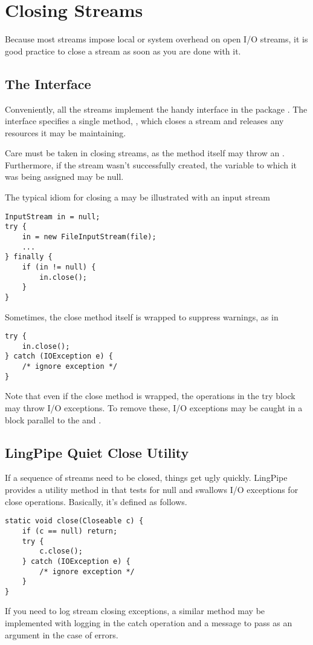 \section{Closing Streams}\label{section:io-closeable}

Because most streams impose local or system overhead on open I/O
streams, it is good practice to close a stream as soon as you are done
with it.  

\subsection{The  Interface}

Conveniently, all the streams implement the handy 
interface in the package .  The 
interface specifies a single method, , which closes a
stream and releases any resources it may be maintaining.

Care must be taken in closing streams, as the  method
itself may throw an .  Furthermore, if the stream
wasn't successfully created, the variable to which it was being
assigned may be null.

The typical idiom for closing a  may be illustrated
with an input stream
%
\begin{verbatim}
InputStream in = null;
try {
    in = new FileInputStream(file);
    ...
} finally {
    if (in != null) {
        in.close();
    }
}
\end{verbatim}
%
Sometimes, the close method itself is wrapped to suppress
warnings, as in
%
\begin{verbatim}
try {
    in.close();
} catch (IOException e) {
    /* ignore exception */
}
\end{verbatim}
%
Note that even if the close method is wrapped, the operations in the
try block may throw I/O exceptions.  To remove these, I/O exceptions
may be caught in a block parallel to the  and
.

\subsection{LingPipe Quiet Close Utility}

If a sequence of streams need to be closed, things get ugly quickly.
LingPipe provides a utility method
 in  that
tests for null and swallows I/O exceptions for close operations.
Basically, it's defined as follows.
%
\begin{verbatim}
static void close(Closeable c) {
    if (c == null) return;
    try {
        c.close();
    } catch (IOException e) {
        /* ignore exception */
    }
}
\end{verbatim}
%
If you need to log stream closing exceptions, a similar method may
be implemented with logging in the catch operation and a message to
pass as an argument in the case of errors.


